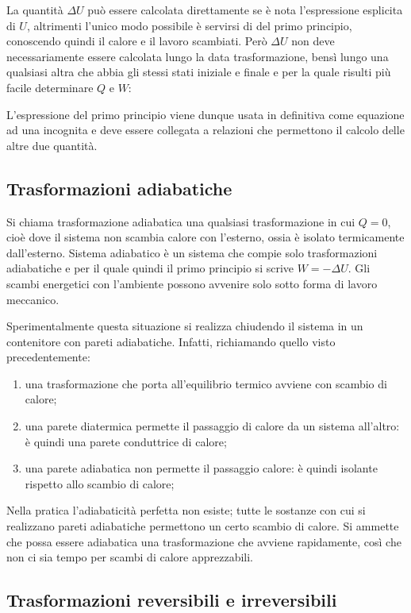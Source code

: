 \documentclass[class=book, crop=false, oneside, 12pt]{standalone}
\begin{document}
La quantità \(\Delta U\) può essere calcolata direttamente se è nota l'espressione esplicita di \(U\), altrimenti l'unico modo possibile è servirsi di del primo principio, conoscendo quindi il calore e il lavoro scambiati. 
Però \(\Delta U\) non deve necessariamente essere calcolata lungo la data trasformazione, bensì lungo una qualsiasi altra che abbia gli stessi stati iniziale e finale e per la quale risulti più facile determinare \(Q\) e \(W\): 

L'espressione del primo principio viene dunque usata in definitiva come equazione ad una incognita e deve essere collegata a relazioni che permettono il calcolo delle altre due quantità.

\subsection{Trasformazioni adiabatiche}

Si chiama trasformazione adiabatica una qualsiasi trasformazione in cui \(Q = 0\), cioè dove il sistema non scambia calore con l'esterno, ossia è isolato termicamente dall'esterno.
Sistema adiabatico è un sistema che compie solo trasformazioni adiabatiche e per il quale quindi il primo principio si scrive \(W = - \Delta U\).
Gli scambi energetici con l'ambiente possono avvenire solo sotto forma di lavoro meccanico. 

Sperimentalmente questa situazione si realizza chiudendo il sistema in un contenitore con pareti adiabatiche. 
Infatti, richiamando quello visto precedentemente:

\begin{enumerate}
    \item una trasformazione che porta all'equilibrio termico avviene con scambio di calore; 
    \item una parete diatermica permette il passaggio di calore da un sistema all'altro: è quindi una parete conduttrice di calore;
    \item una parete adiabatica non permette il passaggio calore: è quindi isolante rispetto allo scambio di calore;
\end{enumerate}

Nella pratica l'adiabaticità perfetta non esiste; tutte le sostanze con cui si realizzano pareti adiabatiche permettono un certo scambio di calore. 
Si ammette che possa essere adiabatica una trasformazione che avviene rapidamente, così che non ci sia tempo per scambi di calore apprezzabili. 

\subsection{Trasformazioni reversibili e irreversibili}
\end{document}
